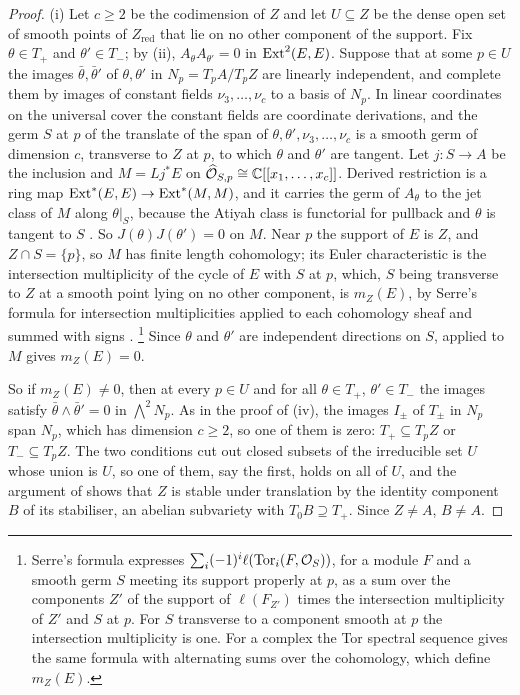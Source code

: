 \begin{proof}
(i) Let $c\ge2$ be the codimension of $Z$ and let $U\subseteq Z$ be the dense
open set of smooth points of $Z_{\mathrm{red}}$ that lie on no other component
of the support. Fix $\theta\in T_{+}$ and $\theta'\in T_{-}$; by
(ii), $A_{\theta}A_{\theta'}=0$ in $\operatorname{Ext}^{2}(E,E)$.
Suppose that at some $p\in U$ the images $\bar\theta,\bar\theta'$ of
$\theta,\theta'$ in $N_{p}=T_{p}A/T_{p}Z$ are linearly independent, and
complete them by images of constant fields $\nu_{3},\dots,\nu_{c}$ to a basis
of $N_{p}$. In linear coordinates on the universal cover the constant fields
are coordinate derivations, and the germ $S$ at $p$ of the translate of the
span of $\theta,\theta',\nu_{3},\dots,\nu_{c}$ is a smooth germ of dimension
$c$, transverse to $Z$ at $p$, to which $\theta$ and $\theta'$ are tangent.
Let $j\colon S\to A$ be the inclusion and $M=Lj^{*}E$ on
$\widehat{\mathcal{O}}_{S,p}\cong\mathbb{C}[[x_{1},\dots,x_{c}]]$. Derived restriction is a
ring map $\operatorname{Ext}^{*}(E,E)\to\operatorname{Ext}^{*}(M,M)$, and it carries the germ of
$A_{\theta}$ to the jet class of $M$ along $\theta|_{S}$, because the Atiyah
class is functorial for pullback and $\theta$ is tangent to $S$
\cite[Section 3]{BF03}. So $J(\theta)J(\theta')=0$ on $M$. Near $p$ the support
of $E$ is $Z$, and $Z\cap S=\{p\}$, so $M$ has finite length cohomology; its
Euler characteristic is the intersection multiplicity of the cycle of $E$
with $S$ at $p$, which, $S$ being transverse to $Z$ at a smooth point lying on
no other component, is $m_{Z}(E)$, by Serre's formula for intersection
multiplicities applied to each cohomology sheaf and summed with signs
\cite[Chapter~V]{Ser00}.%
\footnote{Serre's formula expresses $\sum_{i}(-1)^{i}\ell(\mathrm{Tor}_{i}(F,
\mathcal{O}_{S}))$, for a module $F$ and a smooth germ $S$ meeting its support
properly at $p$, as a sum over the components $Z'$ of the support of
$\ell(F_{Z'})$ times the intersection multiplicity of $Z'$ and $S$ at $p$. For
$S$ transverse to a component smooth at $p$ the intersection multiplicity is
one. For a complex the Tor spectral sequence gives the same formula with
alternating sums over the cohomology, which define $m_{Z}(E)$.}
Since $\theta$ and $\theta'$ are independent directions on $S$,
 applied to $M$ gives $m_{Z}(E)=0$.

So if $m_{Z}(E)\ne0$, then at every $p\in U$ and for all $\theta\in T_{+}$,
$\theta'\in T_{-}$ the images satisfy $\bar\theta\wedge\bar\theta'=0$ in
$\bigwedge^{2}N_{p}$. As in the proof of (iv), the images
$I_{\pm}$ of $T_{\pm}$ in $N_{p}$ span $N_{p}$, which has dimension $c\ge2$,
so one of them is zero: $T_{+}\subseteq T_{p}Z$ or $T_{-}\subseteq T_{p}Z$.
The two conditions cut out closed subsets of the irreducible set $U$ whose
union is $U$, so one of them, say the first, holds on all of $U$, and the
argument of  shows that $Z$ is stable under translation by
the identity component $B$ of its stabiliser, an abelian subvariety with
$T_{0}B\supseteq T_{+}$. Since $Z\ne A$, $B\ne A$.


\end{proof}
